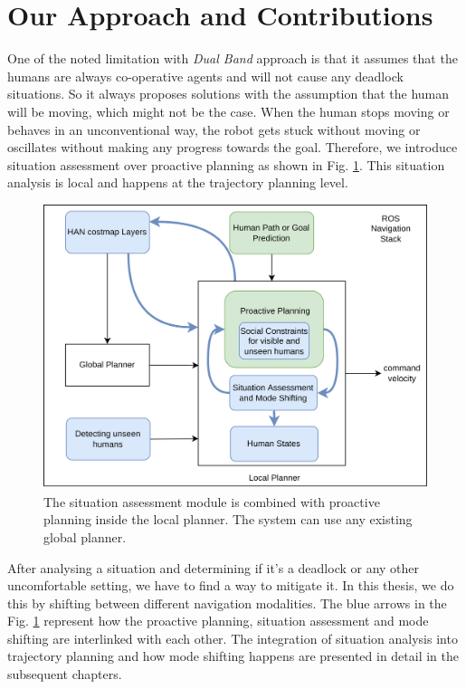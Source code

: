 \section{Our Approach and Contributions}
One of the noted limitation with \textit{Dual Band} approach is that it assumes that the humans are always co-operative agents and will not cause any deadlock situations. So it always proposes solutions with the assumption that the human will be moving, which might not be the case. When the human stops moving or behaves in an unconventional way, the robot gets stuck without moving or oscillates without making any progress towards the goal. Therefore, we introduce situation assessment over proactive planning as shown in Fig. \ref{fig:full_contrib}. This situation analysis is local and happens at the trajectory planning level. 
\begin{figure}[h!]
    \centering
    \includegraphics[width=0.8\columnwidth]{images/contrib_new.png}    \caption{The situation assessment module is combined with proactive planning inside the local planner. The system can use any existing global planner.}
    \label{fig:full_contrib}
\end{figure}
After analysing a situation and determining if it's a deadlock or any other uncomfortable setting, we have to find a way to mitigate it. In this thesis, we do this by shifting between different navigation modalities. The blue arrows in the Fig. \ref{fig:full_contrib} represent how the proactive planning, situation assessment and mode shifting are interlinked with each other. The integration of situation analysis into trajectory planning and how mode shifting happens are presented in detail in the subsequent chapters.


